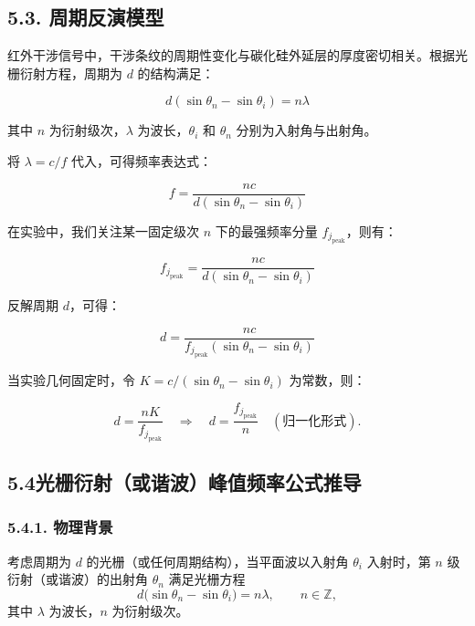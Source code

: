 \documentclass[withoutpreface,bwprint]{cumcmthesis}
\begin{document}
\subsection*{5.3. 周期反演模型}

红外干涉信号中，干涉条纹的周期性变化与碳化硅外延层的厚度密切相关。根据光栅衍射方程，周期为 $d$ 的结构满足：

\begin{equation}
    d(\sin\theta_n - \sin\theta_i) = n\lambda
\end{equation}

其中 $n$ 为衍射级次，$\lambda$ 为波长，$\theta_i$ 和 $\theta_n$ 分别为入射角与出射角。

将 $\lambda = c / f$ 代入，可得频率表达式：

\begin{equation}
    f = \frac{n c}{d(\sin\theta_n - \sin\theta_i)}
\end{equation}

在实验中，我们关注某一固定级次 $n$ 下的最强频率分量 $f_{j_{\text{peak}}}$，则有：

\begin{equation}
    f_{j_{\text{peak}}} = \frac{n c}{d(\sin\theta_n - \sin\theta_i)}
\end{equation}

反解周期 $d$，可得：

\begin{equation}
    d = \frac{n c}{f_{j_{\text{peak}}}(\sin\theta_n - \sin\theta_i)}
\end{equation}

当实验几何固定时，令 $K = c / (\sin\theta_n - \sin\theta_i)$ 为常数，则：

\begin{equation}
    d = \frac{n K}{f_{j_{\text{peak}}}} \quad \Rightarrow \quad d = \frac{f_{j_{\text{peak}}}}{n} \quad (\text{归一化形式}).
\end{equation}



\subsection*{5.4光栅衍射（或谐波）峰值频率公式推导}
\subsubsection*{5.4.1. 物理背景}
考虑周期为 $d$ 的光栅（或任何周期结构），当平面波以入射角 $\theta_i$ 入射时，第 $n$ 级衍射（或谐波）的出射角 $\theta_n$ 满足光栅方程
\begin{equation}
d\bigl(\sin\theta_n - \sin\theta_i\bigr) = n\lambda,
\qquad
n\in\mathbb{Z},
\end{equation}
其中 $\lambda$ 为波长，$n$ 为衍射级次。
\end{document}
